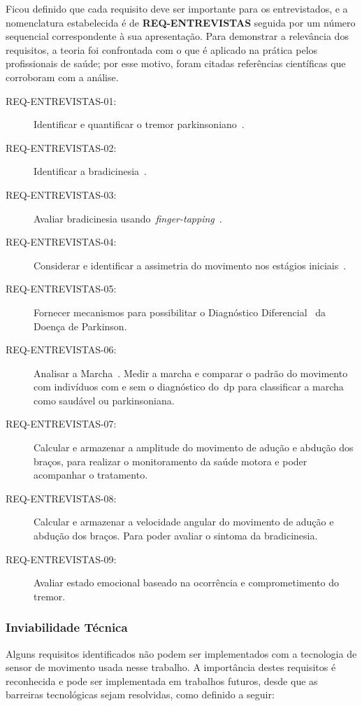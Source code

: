 Ficou definido que cada requisito deve ser importante para os entrevistados, e a nomenclatura estabelecida é de \textbf{REQ-ENTREVISTAS} seguida por um número sequencial correspondente à sua apresentação. Para demonstrar a relevância dos requisitos, a teoria foi confrontada com o que é aplicado na prática pelos profissionais de saúde; por esse motivo, foram citadas referências científicas que corroboram com a análise. 

\begin{description}
	\item[REQ-ENTREVISTAS-01:] Identificar e quantificar o tremor parkinsoniano~\cite{tolosa06,keijsers2006,lemoyne2010}.
	\item[REQ-ENTREVISTAS-02:] Identificar a bradicinesia~\cite{patel_monitoring_2009}. 
	\item[REQ-ENTREVISTAS-03:] Avaliar bradicinesia usando~\textit{finger-tapping}~\cite{finger2012}.
	\item[REQ-ENTREVISTAS-04:] Considerar e identificar a assimetria do movimento nos estágios iniciais~\cite{national2006parkinson}.	
	\item[REQ-ENTREVISTAS-05:] Fornecer mecanismos para possibilitar o Diagnóstico Diferencial~\cite{protpar010} da Doença de Parkinson. 
	\item[REQ-ENTREVISTAS-06:] Analisar a Marcha~\cite{gaitusingsensorsreview2012}. Medir a marcha e comparar o padrão do movimento com indivíduos com e sem o diagnóstico do~\ac{dp} para classificar a marcha como saudável ou parkinsoniana.
	\item[REQ-ENTREVISTAS-07:] Calcular e armazenar a amplitude do movimento de adução e abdução dos braços, para realizar o monitoramento da saúde motora e poder acompanhar o tratamento.
	\item[REQ-ENTREVISTAS-08:] Calcular e armazenar a velocidade angular do movimento de adução e abdução dos braços. Para poder avaliar o sintoma da bradicinesia.
	\item[REQ-ENTREVISTAS-09:] Avaliar estado emocional baseado na ocorrência e comprometimento do tremor. 
\end{description}



\subsubsection{Inviabilidade Técnica}
Alguns requisitos identificados não podem ser implementados com a tecnologia de sensor de movimento usada nesse trabalho. A importância destes requisitos é reconhecida e pode ser implementada em trabalhos futuros, desde que as barreiras tecnológicas sejam resolvidas, como definido a seguir:

